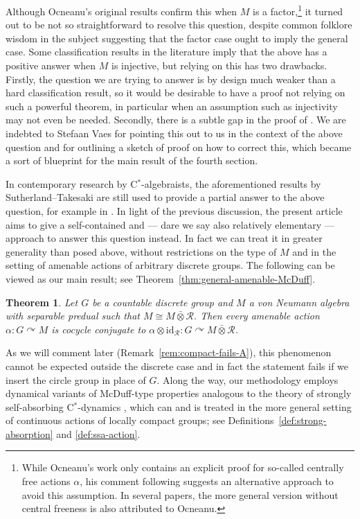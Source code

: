\documentclass[11pt,a4paper]{article}
\newtheorem{theoremi}[theoremiCT]{Theorem}
\theoremstyle{definition}
\theoremstyle{remark}
\numberwithin{equation}{section}
\numberwithin{theorem}{section}
\newcommand{\acts}{\curvearrowright}
\newcommand{\cstar}{C$^*$}
\begin{document}
Although Ocneanu's original results confirm this when $M$ is a factor,\footnote{While Ocneanu's work \cite{Ocneanu85} only contains an explicit proof for so-called centrally free actions $\alpha$, his comment following \cite[Theorem 1.2]{Ocneanu85} suggests an alternative approach to avoid this assumption. In several papers, the more general version without central freeness is also attributed to Ocneanu.} it turned out to be not so straightforward to resolve this question, despite common folklore wisdom in the subject suggesting that the factor case ought to imply the general case.
Some classification results in the literature \cite{JonesTakesaki84, SutherlandTakesaki85} imply that the above has a positive answer when $M$ is injective, but relying on this has two drawbacks.
Firstly, the question we are trying to answer is by design much weaker than a hard classification result, so it would be desirable to have a proof not relying on such a powerful theorem, in particular when an assumption such as injectivity may not even be needed.
Secondly, there is a subtle gap in the proof of \cite[Lemma 4.2]{SutherlandTakesaki85}.
We are indebted to Stefaan Vaes for pointing this out to us in the context of the above question and for outlining a sketch of proof on how to correct this, which became a sort of blueprint for the main result of the fourth section.

In contemporary research by \cstar-algebraists, the aforementioned results by Sutherland--Takesaki are still used to provide a partial answer to the above question, for example in \cite{GardellaHirshbergVaccaro}. In light of the previous discussion, the present article aims to give a self-contained and --- dare we say also relatively elementary --- approach to answer this question instead.
In fact we can treat it in greater generality than posed above, without restrictions on the type of $M$ and in the setting of amenable actions of arbitrary discrete groups.
The following can be viewed as our main result; see Theorem~\ref{thm:general-amenable-McDuff}.

\begin{theoremi} \label{theorem-A}
Let $G$ be a countable discrete group and $M$ a von Neumann algebra with separable predual such that $M \cong M\bar{\otimes} \mathcal{R}$. 
Then every amenable action $\alpha\colon G \acts M$ is cocycle conjugate to $\alpha \otimes \mathrm{id}_\mathcal{R}\colon G\curvearrowright M\bar{\otimes} \mathcal{R}$.
\end{theoremi}

As we will comment later (Remark~\ref{rem:compact-fails-A}), this phenomenon cannot be expected outside the discrete case and in fact the statement fails if we insert the circle group in place of $G$.
Along the way, our methodology employs dynamical variants of McDuff-type properties analogous to the theory of strongly self-absorbing \cstar-dynamics \cite{Szabo18ssa}, which can and is treated in the more general setting of continuous actions of locally compact groups; see Definitions~\ref{def:strong-absorption} and \ref{def:ssa-action}.
\end{document}
